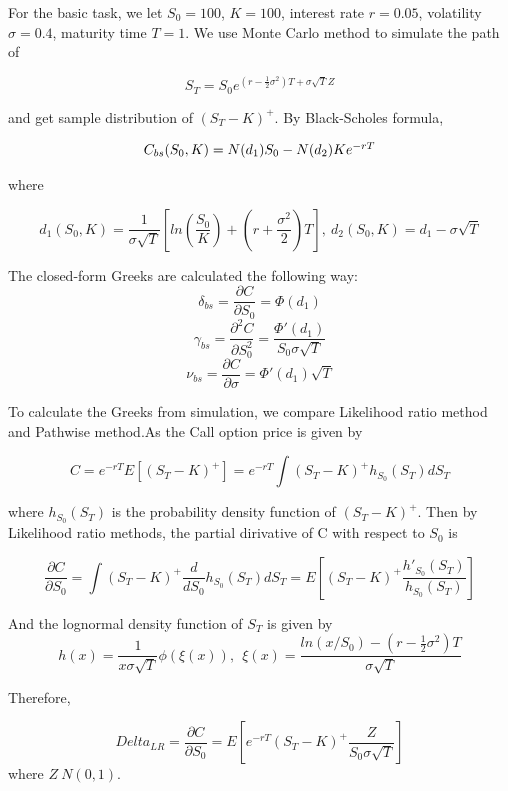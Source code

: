 \documentclass[12pt,a4paper,fleqn]{article}
\begin{document}
For the basic task, we let $S_0 = 100$, $K=100$, interest rate $r = 0.05$, volatility $\sigma = 0.4$, maturity time $T =1$. We use Monte Carlo method to simulate the path of

$$S_T=S_0e^{(r-\frac{1}{2}\sigma ^2)T+\sigma \sqrt{T}Z} $$

and get sample distribution of $(S_T-K)^+$. By Black-Scholes formula,


\begin{equation}
$$C_{bs}(S_0, K) = N(d_1)S_0 - N(d_2)Ke^{-rT}$$
\end{equation}

where

\begin{equation}
d_1(S_0,K)=\frac{1}{\sigma \sqrt{T}}[ln(\frac{S_0}{K})+(r+\frac{\sigma^2}{2})T],\ d_2(S_0,K) = d_1-\sigma \sqrt{T}
\end{equation}

The closed-form Greeks are calculated the following way:
\begin{equation}
\delta_{bs} = \frac{\partial C}{\partial S_0}=\Phi(d_1)
\end{equation}
\begin{equation}
\gamma_{bs} = \frac{\partial^2 C}{\partial S_0^2}=\frac{\Phi'(d_1)}{S_0\sigma \sqrt{T}}
\end{equation}
\begin{equation}
\nu_{bs} =  \frac{\partial C}{\partial \sigma}=\Phi'(d_1)\sqrt{T}
\end{equation}

To calculate the Greeks from simulation, we compare Likelihood ratio method and Pathwise method.As the Call option price is given by

$$C = e^{-rT}E[(S_T-K)^+]=e^{-rT}\int(S_T-K)^+ h_{S_0}(S_T) dS_T$$

where $ h_{S_0}(S_T)$ is the probability density function of $(S_T-K)^+$. Then by Likelihood ratio methods, the partial dirivative of C with respect to $S_0$ is

$$\frac{\partial C}{\partial S_0}=\int(S_T-K)^+\frac{d}{dS_0}h_{S_0}(S_T) dS_T=E[(S_T-K)^+\frac{h'_{S_0}(S_T)}{h_{S_0}(S_T)}] $$

And the lognormal density function of $S_T$ is given by
$$h(x)=\frac{1}{x\sigma \sqrt{T}}\phi(\xi(x)), \ \ \xi(x)=\frac{ln(x/S_0)-(r-\frac{1}{2}\sigma^2)T}{\sigma \sqrt{T}}  $$

Therefore,

$$Delta_{LR}=\frac{\partial C}{\partial S_0}=E[e^{-rT}(S_T-K)^+\frac{Z}{S_0\sigma\sqrt{T}}]$$
where $Z~N(0,1).$
\end{document}
